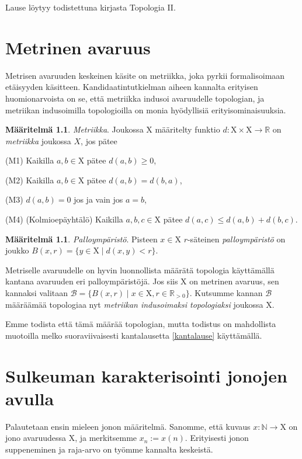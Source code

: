 \documentclass[12pt,a4paper,leqno]{report}
\newcommand{\R}{\mathbb{R}}
\newcommand{\N}{\mathbb{N}}
\newcommand{\X}{\mathrm{X}}
\newcommand{\B}{\mathcal{B}}
\theoremstyle{plain}
\theoremstyle{definition}
\newtheorem{maar}[equation]{Määritelmä}
\theoremstyle{remark}
\begin{document}
Lause löytyy todistettuna kirjasta Topologia II\cite{Topo}.

\chapter{Metrinen avaruus}\label{MET}

Metrisen avaruuden keskeinen käsite on metriikka, joka pyrkii formalisoimaan etäisyyden käsitteen. Kandidaatintutkielman aiheen kannalta erityisen huomionarvoista on se, että metriikka indusoi avaruudelle topologian, ja metriikan indusoimilla topologioilla on monia hyödyllisiä erityisominaisuuksia.

\begin{maar}\label{metmaar}
\emph{Metriikka}. Joukossa $\X$ määritelty funktio $d : \X \times \X \to \R$ on \emph{metriikka} joukossa $X$, jos pätee

(M1) Kaikilla $a, b \in \X$ pätee $d(a,b) \geq 0$,

(M2) Kaikilla $a, b \in \X$ pätee $d(a,b) = d(b,a)$,

(M3) $d(a,b) = 0$ jos ja vain jos $a = b$,

(M4) (Kolmioepäyhtälö) Kaikilla $a, b, c \in \X$ pätee $d(a,c) \leq d(a,b) + d(b,c)$.
\end{maar}

\begin{maar}\label{pallomar}
\emph{Palloympäristö}. Pisteen $x \in \X$ $r$-säteinen \emph{palloympäristö} on joukko $B(x,r) = \{ y \in \X \mid d(x, y) < r \}$.
\end{maar}

Metriselle avaruudelle on hyvin luonnollista määrätä topologia käyttämällä kantana avaruuden eri palloympäristöjä. Jos siis $\X$ on metrinen avaruus, sen kannaksi valitaan $\B = \{ B(x,r) \mid x \in \X, r \in \R_{> 0} \}$. Kutsumme kannan $\B$ määräämää topologiaa nyt \emph{metriikan indusoimaksi topologiaksi} joukossa $\X$.

Emme todista että tämä määrää topologian, mutta todistus on mahdollista muotoilla melko suoraviivaisesti kantalausetta \ref{kantalause} käyttämällä.

\chapter{Sulkeuman karakterisointi jonojen avulla}

Palautetaan ensin mieleen jonon määritelmä. Sanomme, että kuvaus $x : \N \to \X$ on jono avaruudessa $\X$, ja merkitsemme $x_n := x(n)$. Erityisesti jonon suppeneminen ja raja-arvo on työmme kannalta keskeistä.
\end{document}
